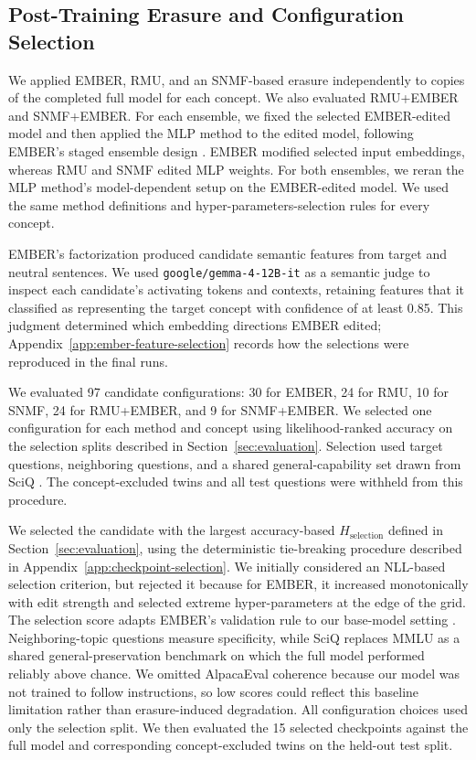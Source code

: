\subsection{Post-Training Erasure and Configuration Selection}

We applied EMBER, RMU, and an SNMF-based erasure independently to copies of
the completed full model for each concept. We also evaluated RMU+EMBER and
SNMF+EMBER. For each ensemble, we fixed the selected EMBER-edited model and
then applied the MLP method to the edited model, following EMBER's staged
ensemble design \citep{suslik2026ember}. EMBER modified selected input
embeddings, whereas RMU and SNMF edited MLP weights. For both ensembles, we
reran the MLP method's model-dependent setup on the EMBER-edited model. We
used the same method definitions and hyper-parameters-selection rules for every
concept.

EMBER's factorization produced candidate semantic features from target and
neutral sentences. We used \texttt{google/gemma-4-12B-it} as a semantic judge
\citep{gemmateam2026gemma4}
to inspect each candidate's activating tokens and contexts, retaining features
that it classified as representing the target concept with confidence of at
least 0.85. This judgment determined which embedding directions EMBER edited;
Appendix~\ref{app:ember-feature-selection} records how the selections were
reproduced in the final runs.

We evaluated 97 candidate configurations: 30 for EMBER, 24 for RMU,
10 for SNMF, 24 for RMU+EMBER, and 9 for SNMF+EMBER. We selected one
configuration for each method and concept using
likelihood-ranked accuracy on the selection splits described in
Section~\ref{sec:evaluation}. Selection used target questions,
neighboring questions, and a shared general-capability set drawn from
SciQ \citep{welbl2017sciq}. The concept-excluded twins and all test questions
were withheld from this procedure.

We selected the candidate with the largest accuracy-based
$H_{\mathrm{selection}}$ defined in Section~\ref{sec:evaluation}, using the
deterministic tie-breaking procedure described in
Appendix~\ref{app:checkpoint-selection}. We initially considered an NLL-based selection criterion, but rejected it
because for EMBER, it increased monotonically with edit strength and selected
extreme hyper-parameters at the edge of the grid. The selection score adapts EMBER's validation rule to our base-model setting
\citep{suslik2026ember}. Neighboring-topic questions measure specificity,
while SciQ replaces MMLU as a shared general-preservation benchmark on which
the full model performed reliably above chance. We omitted AlpacaEval
coherence because our model was not trained to follow instructions, so low
scores could reflect this baseline limitation rather than erasure-induced
degradation. All configuration choices used only the selection split. We then
evaluated the 15 selected checkpoints against the full model and corresponding
concept-excluded twins on the held-out test split.
